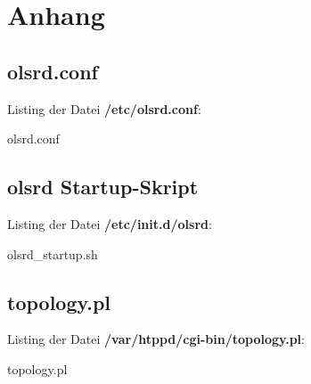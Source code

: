 
\section{Anhang}

\subsection{olsrd.conf}
\label{olsrd.conf}

Listing der Datei \textbf{/etc/olsrd.conf}:

{olsrd.conf}

\subsection{olsrd Startup-Skript}
\label{olsrd_startup.sh}

Listing der Datei \textbf{/etc/init.d/olsrd}:

{olsrd_startup.sh}

\subsection{topology.pl}
\label{topology.pl}

Listing der Datei \textbf{/var/htppd/cgi-bin/topology.pl}:

{topology.pl}
